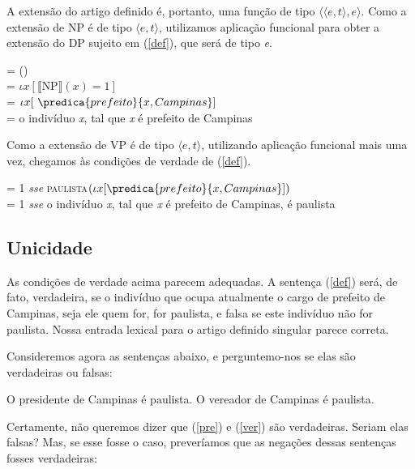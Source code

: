 \n A extensão do artigo definido é, portanto, uma função de tipo
$\langle\langle e,t\rangle,e\rangle$. Como a extensão de NP é de
tipo $\langle e,t\rangle$, utilizamos aplicação funcional para
obter a extensão do DP sujeito em (\ref{def}), que será de tipo
\textit{e}.

\begin{exe}
	\ex {} = () \\
		= $\iota x[\llbracket \text{NP} \rrbracket(x)=1]$ \\
		= $\iota x[\ \predica{prefeito}{x, Campinas}]$ \\
		= o indivíduo \textit{x}, tal que \textit{x} é prefeito de Campinas
\end{exe}

\n Como a extensão de VP é de tipo $\langle e,t\rangle$,
utilizando aplicação funcional mais uma vez, chegamos às condições
de verdade de (\ref{def}).

\begin{exe}
	\ex \den{(\ref{def})} = 1 \textit{sse} \textsc{paulista}$(\iota x[  \predica{prefeito}{x, Campinas}]) $ \\
		\den{(\ref{def})} = 1 \textit{sse} o indivíduo \textit{x}, tal que \textit{x} é prefeito de Campinas, é paulista
\end{exe}

\subsection{Unicidade}

\n As condições de verdade acima parecem adequadas. A sentença
(\ref{def}) será, de fato, verdadeira, se o indivíduo que ocupa
atualmente o cargo de prefeito de Campinas, seja ele quem for, for
paulista, e falsa se este indivíduo não for paulista. Nossa
entrada lexical para o artigo definido singular parece correta.

Consideremos agora as sentenças abaixo, e perguntemo-nos se elas
são verdadeiras ou falsas:

\begin{exe}
\ex O presidente de Campinas é paulista.\label{pre}
\ex O vereador de Campinas é paulista.\label{ver}
\end{exe}

Certamente, não queremos dizer que (\ref{pre}) e (\ref{ver}) são
verdadeiras. Seriam elas falsas? Mas, se esse fosse o caso,
preveríamos que as negações dessas sentenças fosses verdadeiras:

